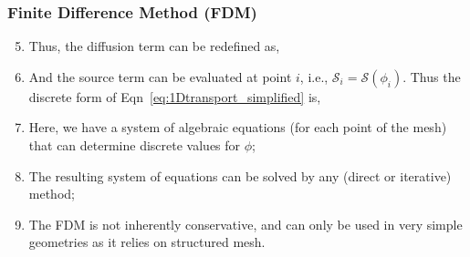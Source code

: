 \documentclass[10pt,compress,handout,ignorenonframetext]{beamer}
\begin{document}
\begin{frame}
 \frametitle{Finite Difference Method (FDM)} 

\begin{enumerate}
   \setcounter{enumi}{4}
  \item <1-> Thus, the diffusion term can be redefined as,
  \item <2-> And the source term can be evaluated at point $i$, i.e., $\mathcal{S}_{i}=\mathcal{S}\left(\phi_{i}\right)$. Thus the discrete form of Eqn~\ref{eq:1Dtransport_simplified} is,
  \item <3-> Here, we have a system of algebraic equations (for each point of the mesh) that can determine discrete values for $\phi$;
  \item <4-> The resulting system of equations can be solved by any (direct or iterative) method;
  \item <5-> The FDM is not inherently conservative, and can only be used in very simple geometries as it relies on structured mesh.

\end{enumerate}  
 
\end{frame}
\end{document}
